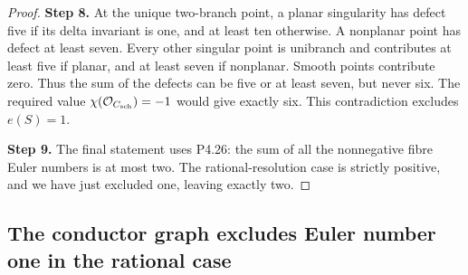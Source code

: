 \begin{proof}
\noindent\textbf{Step 8.} At the unique two-branch point, a planar singularity
has defect five if its delta invariant is one, and
at least ten otherwise. A nonplanar point has defect
at least seven. Every other singular point is
unibranch and contributes at least five if planar,
and at least seven if nonplanar. Smooth points
contribute zero. Thus the sum of the defects can
be five or at least seven, but never six.
The required value $\chi(\mathcal O_{C_{\rm sch}})=-1$
would give exactly six. This contradiction excludes
$e(S)=1$.

\noindent\textbf{Step 9.} The final statement uses P4.26: the sum of all the
nonnegative fibre Euler numbers is at most two.
The rational-resolution case is strictly positive,
and we have just excluded one, leaving exactly two.
\end{proof}


\subsection{The conductor graph excludes Euler number one in the rational case}


